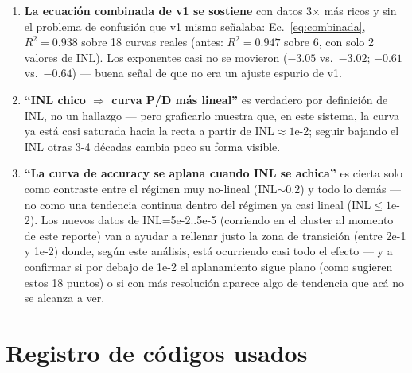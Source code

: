 \documentclass[11pt]{article}
\begin{document}
\begin{enumerate}
\item \textbf{La ecuación combinada de v1 se sostiene} con datos 3$\times$
  más ricos y sin el problema de confusión que v1 mismo señalaba:
  Ec.~\ref{eq:combinada}, $R^2=0.938$ sobre 18 curvas reales (antes:
  $R^2=0.947$ sobre 6, con solo 2 valores de INL). Los exponentes casi no
  se movieron ($-3.05$ vs.\ $-3.02$; $-0.61$ vs.\ $-0.64$) --- buena señal
  de que no era un ajuste espurio de v1.
\item \textbf{``INL chico $\Rightarrow$ curva P/D más lineal''} es
  verdadero por definición de INL, no un hallazgo --- pero graficarlo
  muestra que, en este sistema, la curva ya está casi saturada hacia la
  recta a partir de INL$\approx1$e-2; seguir bajando el INL otras 3-4
  décadas cambia poco su forma visible.
\item \textbf{``La curva de accuracy se aplana cuando INL se achica''} es
  cierta solo como contraste entre el régimen muy no-lineal (INL$\sim0.2$)
  y todo lo demás --- no como una tendencia continua dentro del régimen ya
  casi lineal (INL$\leq1$e-2). Los nuevos datos de INL=5e-2..5e-5
  (corriendo en el cluster al momento de este reporte) van a ayudar a
  rellenar justo la zona de transición (entre 2e-1 y 1e-2) donde,
  según este análisis, está ocurriendo casi todo el efecto --- y a
  confirmar si por debajo de 1e-2 el aplanamiento sigue plano (como
  sugieren estos 18 puntos) o si con más resolución aparece algo de
  tendencia que acá no se alcanza a ver.
\end{enumerate}

\section{Registro de códigos usados}
\end{document}
